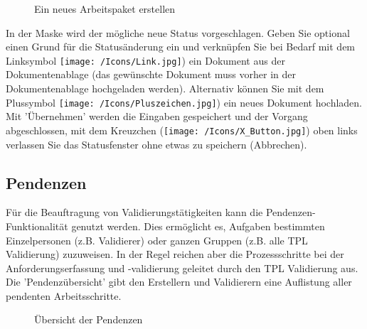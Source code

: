 \begin{figure}[H]
\caption{Ein neues Arbeitspaket erstellen}
\end{figure}

In der Maske wird der mögliche neue Status vorgeschlagen. Geben Sie optional einen Grund für die Statusänderung ein und verknüpfen Sie bei Bedarf mit dem Linksymbol \texttt{[image: /Icons/Link.jpg]}) ein Dokument aus der Dokumentenablage (das gewünschte Dokument muss vorher in der Dokumentenablage hochgeladen werden). Alternativ können Sie mit dem Plussymbol \texttt{[image: /Icons/Pluszeichen.jpg]}) ein neues Dokument hochladen.\\
Mit 'Übernehmen' werden die Eingaben gespeichert und der Vorgang abgeschlossen, mit dem Kreuzchen (\texttt{[image: /Icons/X\_Button.jpg]}) oben links verlassen Sie das Statusfenster ohne etwas zu speichern (Abbrechen).

\subsection{Pendenzen}

Für die Beauftragung von Validierungstätigkeiten kann die Pendenzen-Funktionalität genutzt werden. Dies ermöglicht es, Aufgaben bestimmten Einzelpersonen (z.B. Validierer) oder ganzen Gruppen (z.B. alle TPL Validierung) zuzuweisen. In der Regel reichen aber die Prozessschritte bei der Anforderungserfassung und -validierung geleitet durch den TPL Validierung aus. Die 'Pendenzübersicht' gibt den Erstellern und Validierern eine Auflistung aller pendenten Arbeitsschritte. 

\begin{figure}[H]
\caption{Übersicht der Pendenzen}
\end{figure}

